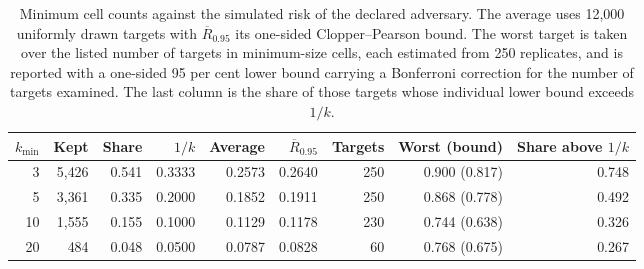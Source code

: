 \begin{table}[t]
\centering
\caption{Minimum cell counts against the simulated risk of the declared adversary. The average uses 12{,}000 uniformly drawn targets with $\overline{R}_{0.95}$ its one-sided Clopper--Pearson bound. The worst target is taken over the listed number of targets in minimum-size cells, each estimated from 250 replicates, and is reported with a one-sided 95 per cent lower bound carrying a Bonferroni correction for the number of targets examined. The last column is the share of those targets whose individual lower bound exceeds $1/k$.}
\label{tab:kanon}
\small
\begin{tabular}{rrrrrrrrr}
\toprule
$k_{\min}$ & Kept & Share & $1/k$ & Average & $\overline{R}_{0.95}$ &
Targets & Worst (bound) & Share above $1/k$ \\
\midrule
3 & 5{,}426 & 0.541 & 0.3333 & 0.2573 & 0.2640 & 250 & 0.900 (0.817) & 0.748 \\
5 & 3{,}361 & 0.335 & 0.2000 & 0.1852 & 0.1911 & 250 & 0.868 (0.778) & 0.492 \\
10 & 1{,}555 & 0.155 & 0.1000 & 0.1129 & 0.1178 & 230 & 0.744 (0.638) & 0.326 \\
20 & 484 & 0.048 & 0.0500 & 0.0787 & 0.0828 & 60 & 0.768 (0.675) & 0.267 \\
\bottomrule
\end{tabular}
\end{table}
